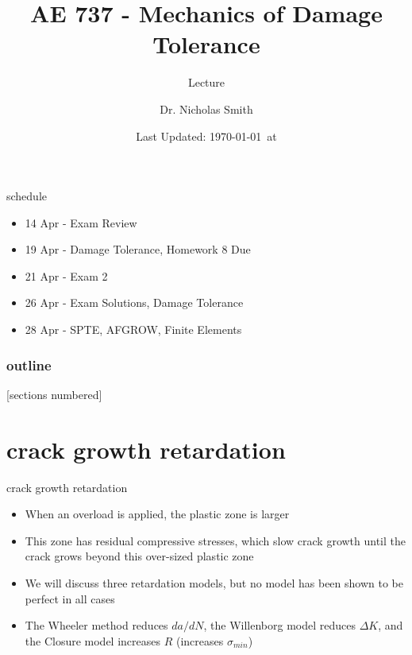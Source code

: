 \documentclass[10pt]{beamer}
\title{AE 737 - Mechanics of Damage Tolerance}
\subtitle{Lecture \arabic{lecture}}
\date{Last Updated: \today\ at \DTMcurrenttime}
\author{Dr. Nicholas Smith}
\institute{Wichita State University, Department of Aerospace Engineering}
\begin{document}
	
	\maketitle
	\begin{frame}{schedule}
		\begin{itemize}
			\item 14 Apr - Exam Review
			\item 19 Apr - Damage Tolerance, Homework 8 Due
			\item 21 Apr - Exam 2
			\item 26 Apr - Exam Solutions, Damage Tolerance
			\item 28 Apr - SPTE, AFGROW, Finite Elements
		\end{itemize}
	\end{frame}
	
	\begin{frame}
		\frametitle{outline}
		[sections numbered]
		\tableofcontents[hideallsubsections]
	\end{frame}

	\section{crack growth retardation}
	
	\begin{frame}{crack growth retardation}
		\begin{itemize}[<+->]
			\item When an overload is applied, the plastic zone is larger
			\item This zone has residual compressive stresses, which slow crack growth until the crack grows beyond this over-sized plastic zone
			\item We will discuss three retardation models, but no model has been shown to be perfect in all cases
			\item The Wheeler method reduces $da/dN$, the Willenborg model reduces $\Delta K$, and the Closure model increases $R$ (increases $\sigma_{min}$)
		\end{itemize}
	\end{frame}
	
\end{document}
